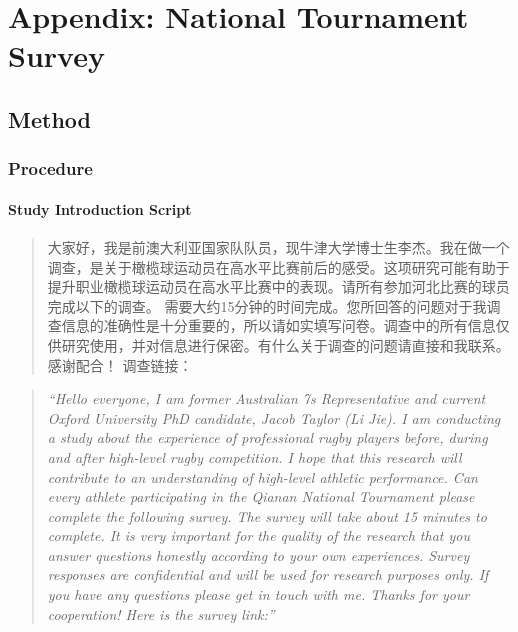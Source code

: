 \chapter{Appendix: National Tournament Survey\label{app8:tournamentSurvey}}












\section{Method\label{app8:method}}



\subsection{Procedure\label{app8:procedure}}


\subsubsection{Study Introduction Script\label{app8:studyIntro}}

\begin{CJK}{UTF8}{gbsn}
  \begin{quote}
    大家好，我是前澳大利亚国家队队员，现牛津大学博士生李杰。我在做一个调查，是关于橄榄球运动员在高水平比赛前后的感受。这项研究可能有助于提升职业橄榄球运动员在高水平比赛中的表现。请所有参加河北比赛的球员完成以下的调查。
    需要大约15分钟的时间完成。您所回答的问题对于我调查信息的准确性是十分重要的，所以请如实填写问卷。调查中的所有信息仅供研究使用，并对信息进行保密。有什么关于调查的问题请直接和我联系。感谢配合！ 调查链接：
  \end{quote}
\end{CJK}

\begin{quote}
      \textit{``Hello everyone, I am former Australian 7s Representative and current Oxford University PhD candidate, Jacob Taylor (Li Jie). I am conducting a study about the experience of professional rugby players before, during and after high-level rugby competition. I hope that this research will contribute to an understanding of high-level athletic performance. Can every athlete participating in the Qianan National Tournament please complete the following survey. The survey will take about 15 minutes to complete. It is very important for the quality of the research that you answer questions honestly according to your own experiences. Survey responses are confidential and will be used for research purposes only. If you have any questions please get in touch with me. Thanks for your cooperation! Here is the survey link:''}
\end{quote}




